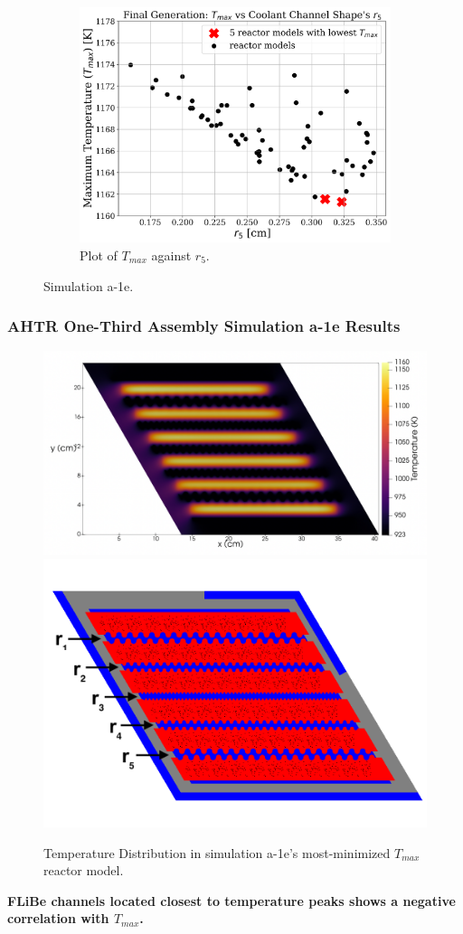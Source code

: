 \begin{frame}
\begin{figure}
        \begin{subfigure}{0.3\textwidth}
            \includegraphics[width=\linewidth]{../docs/figures/a-1e-r5.png}
            \caption{Plot of $T_{max}$ against $r_5$.}
            \label{fig:a-1e-r5} 
        \end{subfigure}
        \caption{Simulation a-1e.}
    \end{figure}
\end{frame}

\begin{frame}
    \frametitle{AHTR One-Third Assembly Simulation a-1e Results}
    \begin{figure}
        \includegraphics[width=0.55\linewidth]{../docs/figures/a-1e-temp-distribution-2d.png} 
        \includegraphics[width=0.4\linewidth]{../docs/figures/coolant-channel-shape-assem.png} 
        \caption{Temperature Distribution in simulation a-1e's most-minimized $T_{max}$ reactor 
        model.}
    \end{figure}
    \textbf{FLiBe channels located closest to temperature peaks shows a negative 
    correlation with $T_{max}$.}
\end{frame}


